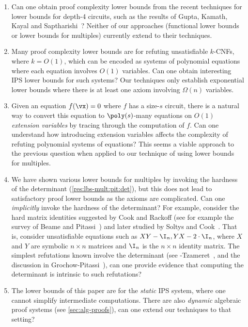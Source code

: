 \documentclass{toc}
\begin{document}
\begin{enumerate}
        \item Can one obtain proof complexity lower bounds from the recent techniques for lower bounds for depth-4 circuits, such as the results of Gupta, Kamath, Kayal and Saptharishi~\cite{GuptaKKS14}? Neither of our approaches (functional lower bounds or lower bounds for multiples) currently extend to their techniques.

        \item Many proof complexity lower bounds are for refuting unsatisfiable $k$-CNFs, where $k=O(1)$, which can be encoded as systems of polynomial equations where each equation involves $O(1)$ variables.  Can one obtain interesting IPS lower bounds for such systems? Our techniques only establish exponential lower bounds where there is at least one axiom involving $\Omega(n)$ variables.

        \item Given an equation $f(\vx)=0$ where $f$ has a size-$s$ circuit, there is a natural way to convert this equation to $\poly(s)$-many equations on $O(1)$ \emph{extension variables} by tracing through the computation of $f$.  Can one understand how introducing extension variables affects the complexity of refuting polynomial systems of equations? This seems a viable approach to the previous question when applied to our technique of using lower bounds for multiples.

        \item We have shown various lower bounds for multiples by invoking the hardness of the determinant (\autoref{res:lbs-mult:pit:det}), but this does not lead to satisfactory proof lower bounds as the axioms are complicated.  Can one \emph{implicitly} invoke the hardness of the determinant?  For example, consider the hard matrix identities suggested by Cook and Rackoff (see for example the survey of Beame and Pitassi~\cite{BeamePitassi98}) and later studied by Soltys and Cook~\cite{SoltysCook04}.  That is, consider unsatisfiable equations such as $XY-\I_n,YX-2\cdot \I_n$, where $X$ and $Y$ are symbolic $n\times n$ matrices and $\I_n$ is the $n\times n$ identity matrix.  The simplest refutations known involve the determinant (see \Hrubes-Tzameret~\cite{HrubesTzameret15}, and the discussion in Grochow-Pitassi~\cite{DBLP:journals/jacm/GrochowP18}), can one provide evidence that computing the determinant is intrinsic to such refutations?

        \item The lower bounds of this paper are for the \emph{static} IPS system, where one cannot simplify intermediate computations.  There are also \emph{dynamic} algebraic proof systems (see \autoref{sec:alg-proofs}), can one extend our techniques to that setting?
\end{enumerate}
\end{document}
